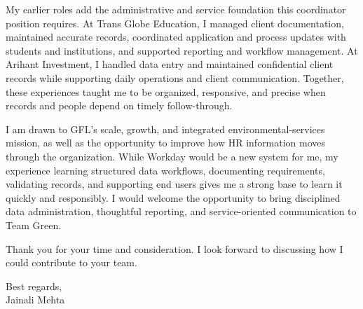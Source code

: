 \documentclass[letterpaper,11pt]{article}
\begin{document}
\bigbreak
My earlier roles add the administrative and service foundation this coordinator position requires. At Trans Globe Education, I managed client documentation, maintained accurate records, coordinated application and process updates with students and institutions, and supported reporting and workflow management. At Arihant Investment, I handled data entry and maintained confidential client records while supporting daily operations and client communication. Together, these experiences taught me to be organized, responsive, and precise when records and people depend on timely follow-through.

\bigbreak
I am drawn to GFL's scale, growth, and integrated environmental-services mission, as well as the opportunity to improve how HR information moves through the organization. While Workday would be a new system for me, my experience learning structured data workflows, documenting requirements, validating records, and supporting end users gives me a strong base to learn it quickly and responsibly. I would welcome the opportunity to bring disciplined data administration, thoughtful reporting, and service-oriented communication to Team Green.

\bigbreak
Thank you for your time and consideration. I look forward to discussing how I could contribute to your team.

\bigbreak
Best regards,\\
Jainali Mehta
\end{document}
